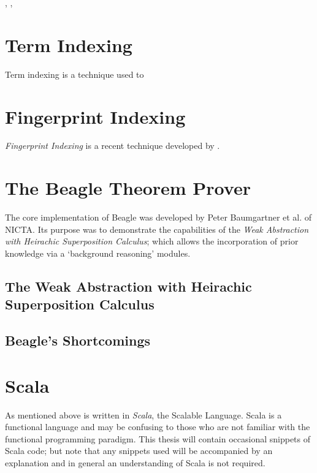 \cite{spass}, \cite{vampire}, \cite{eprover}


\section{Term Indexing}
\label{sec:indexing}

Term indexing is a technique used to 

\section{Fingerprint Indexing}
\label{sec:fingerprint}

\emph{Fingerprint Indexing} is a recent technique developed by .

\section{The Beagle Theorem Prover}
\label{sec:beagle}

The core implementation of Beagle was developed by Peter Baumgartner et al. of NICTA.
Its purpose was to demonstrate the capabilities of the \emph{Weak Abstraction with Heirachic Superposition Calculus};
which allows the incorporation of prior knowledge via a `background reasoning' modules.


\subsection{The Weak Abstraction with Heirachic Superposition Calculus}

\subsection{Beagle's Shortcomings}



\section{Scala}
\label{sec:scala}

As mentioned above \beagle is written in \emph{Scala}, the Scalable Language. Scala
is a functional language and may be confusing to those who are not familiar with the
functional programming paradigm. This thesis will contain occasional snippets of
Scala code; but note that any snippets used will be accompanied by an explanation
and in general an understanding of Scala is not required.





